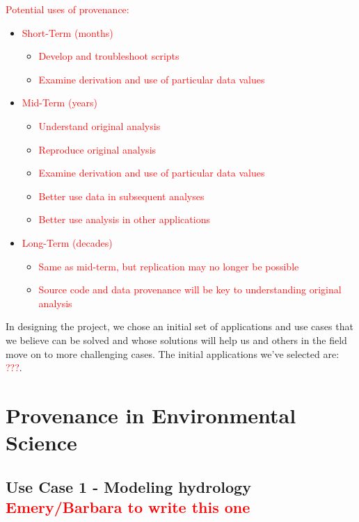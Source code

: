 \documentclass[10pt]{article}
\newcommand{\todo}[1]{\textcolor{red}{#1}}
\begin{document}
\todo{Potential uses of provenance:}
\begin{itemize}
\item \todo{Short-Term (months)}
\begin{itemize}
\item \todo{Develop and troubleshoot scripts}
\item \todo{Examine derivation and use of particular data values}
\end{itemize}

\item \todo{Mid-Term (years)}
\begin{itemize}
\item \todo{Understand original analysis}
\item \todo{Reproduce original analysis}
\item \todo{Examine derivation and use of particular data values}
\item \todo{Better use data in subsequent analyses}
\item \todo{Better use analysis in other applications}
\end{itemize}

\item \todo{Long-Term (decades)}
\begin{itemize}
\item \todo{Same as mid-term, but replication may no longer be possible}
\item \todo{Source code and data provenance will be key to understanding original analysis}
\end{itemize}
\end{itemize}

In designing the project, we chose an initial set of applications
and use cases that we believe can be solved and whose solutions
will help us and others in the field move on to more challenging cases.
The initial applications we've selected are: 
\todo{???}.

\section{Provenance in Environmental Science}



\subsection{Use Case 1 - Modeling hydrology \todo{Emery/Barbara to write this one}}
\end{document}
